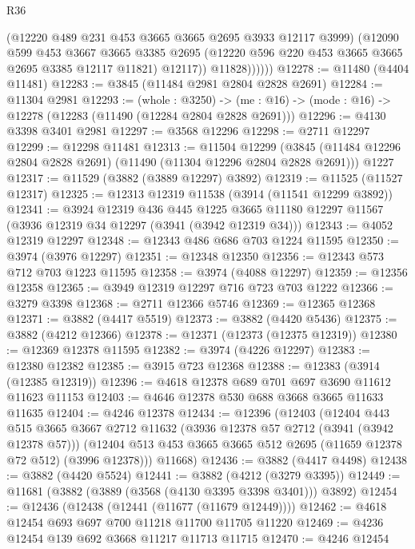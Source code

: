 \begin{lexlean}{R36}
\begin{coremodule}
                  (@12220 @489 @231 @453 @3665 @3665 @2695 @3933 @12117 @3999)
                  (@12090
                    @599
                    @453
                    @3667
                    @3665
                    @3385
                    @2695
                    (@12220 @596 @220 @453 @3665 @3665 @2695 @3385 @12117 @11821)
                    @12117))
                @11828))))))
@12278 := @11480 (@4404 @11481)
@12283 := @3845 (@11484 @2981 @2804 @2828 @2691)
@12284 := @11304 @2981
@12293 := (whole : @3250) ->
  (me : @16) -> (mode : @16) -> @12278 (@12283 (@11490 (@12284 @2804 @2828 @2691)))
@12296 := @4130 @3398 @3401 @2981
@12297 := @3568 @12296
@12298 := @2711 @12297
@12299 := @12298 @11481
@12313 := @11504
    @12299
    (@3845 (@11484 @12296 @2804 @2828 @2691) (@11490 (@11304 @12296 @2804 @2828 @2691)))
    @1227
@12317 := @11529 (@3882 (@3889 @12297) @3892)
@12319 := @11525 (@11527 @12317)
@12325 := @12313 @12319 @11538 (@3914 (@11541 @12299 @3892))
@12341 := @3924
    @12319
    @436
    @445
    @1225
    @3665
    @11180
    @12297
    @11567
    (@3936 @12319 @34 @12297 (@3941 (@3942 @12319 @34)))
@12343 := @4052 @12319 @12297
@12348 := @12343 @486 @686 @703 @1224 @11595
@12350 := @3974 (@3976 @12297)
@12351 := @12348 @12350
@12356 := @12343 @573 @712 @703 @1223 @11595
@12358 := @3974 (@4088 @12297)
@12359 := @12356 @12358
@12365 := @3949 @12319 @12297 @716 @723 @703 @1222
@12366 := @3279 @3398
@12368 := @2711 @12366 @5746
@12369 := @12365 @12368
@12371 := @3882 (@4417 @5519)
@12373 := @3882 (@4420 @5436)
@12375 := @3882 (@4212 @12366)
@12378 := @12371 (@12373 (@12375 @12319))
@12380 := @12369 @12378 @11595
@12382 := @3974 (@4226 @12297)
@12383 := @12380 @12382
@12385 := @3915 @723 @12368
@12388 := @12383 (@3914 (@12385 @12319))
@12396 := @4618 @12378 @689 @701 @697 @3690 @11612 @11623 @11153
@12403 := @4646 @12378 @530 @688 @3668 @3665 @11633 @11635
@12404 := @4246 @12378
@12434 := @12396
    (@12403
      (@12404
        @443
        @515
        @3665
        @3667
        @2712
        @11632
        (@3936 @12378 @57 @2712 (@3941 (@3942 @12378 @57)))
        (@12404 @513 @453 @3665 @3665 @512 @2695 (@11659 @12378 @72 @512) (@3996 @12378)))
      @11668)
@12436 := @3882 (@4417 @4498)
@12438 := @3882 (@4420 @5524)
@12441 := @3882 (@4212 (@3279 @3395))
@12449 := @11681 (@3882 (@3889 (@3568 (@4130 @3395 @3398 @3401))) @3892)
@12454 := @12436 (@12438 (@12441 (@11677 (@11679 @12449))))
@12462 := @4618 @12454 @693 @697 @700 @11218 @11700 @11705 @11220
@12469 := @4236 @12454 @139 @692 @3668 @11217 @11713 @11715
@12470 := @4246 @12454

\end{coremodule}
\end{lexlean}
